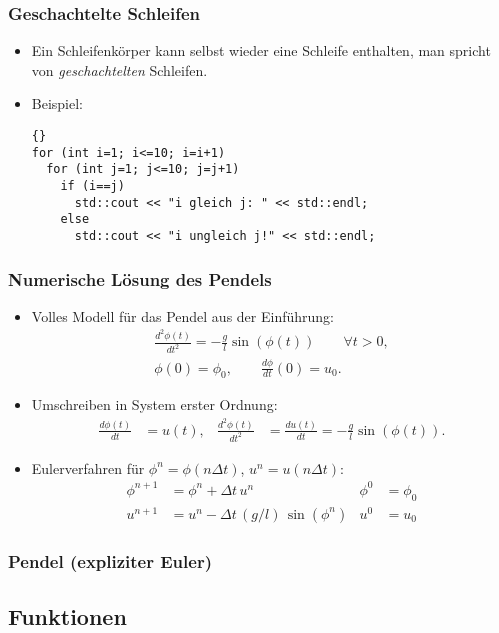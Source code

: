 \documentclass[ignorenonframetext,12pt]{beamer}
\theoremstyle{definition}
\theoremstyle{definition}
\begin{document}
\begin{frame}[fragile]
\frametitle{Geschachtelte Schleifen}
\begin{itemize}
\item Ein Schleifenkörper kann selbst wieder eine Schleife enthalten,
  man spricht von \textsl{geschachtelten} Schleifen.
\item Beispiel:
{\scriptsize\begin{lstlisting}{}
for (int i=1; i<=10; i=i+1)
  for (int j=1; j<=10; j=j+1)
    if (i==j)
      std::cout << "i gleich j: " << std::endl;
    else
      std::cout << "i ungleich j!" << std::endl;
\end{lstlisting}}
\end{itemize}
\end{frame}

\begin{frame}[fragile]
\frametitle{Numerische Lösung des Pendels}
\begin{itemize}
\item Volles Modell für das Pendel aus der Einführung:
  \begin{gather*}
    \frac{d^2\phi(t)}{d t^2} = - \frac{g}{l} \sin(\phi(t)) \qquad \forall t>0,\\
    \phi(0) = \phi_0, \qquad \frac{d \phi}{d t}(0) = u_0.
  \end{gather*}
\item Umschreiben in System erster Ordnung:
  \begin{align*}
    \frac{d\phi(t)}{d t} &= u(t), & \frac{d^2\phi(t)}{d t^2} &=
    \frac{d u(t)}{d t} = - \frac{g}{l} \sin(\phi(t)).
  \end{align*}
\item Eulerverfahren für $\phi^n = \phi(n\Delta t)$, $u^n = u(n\Delta t)$:
  \begin{align*}
    \phi^{n+1} &= \phi^n + \Delta t \, u^n & \phi^0 &= \phi_0\\
    u^{n+1} &= u^n -\Delta t \, (g/l) \, \sin(\phi^n) & u^0 &= u_0
  \end{align*}
\end{itemize}
\end{frame}

\begin{frame}[fragile]
\frametitle{Pendel (expliziter Euler)}

\end{frame}

\subsection{Funktionen}
\end{document}
